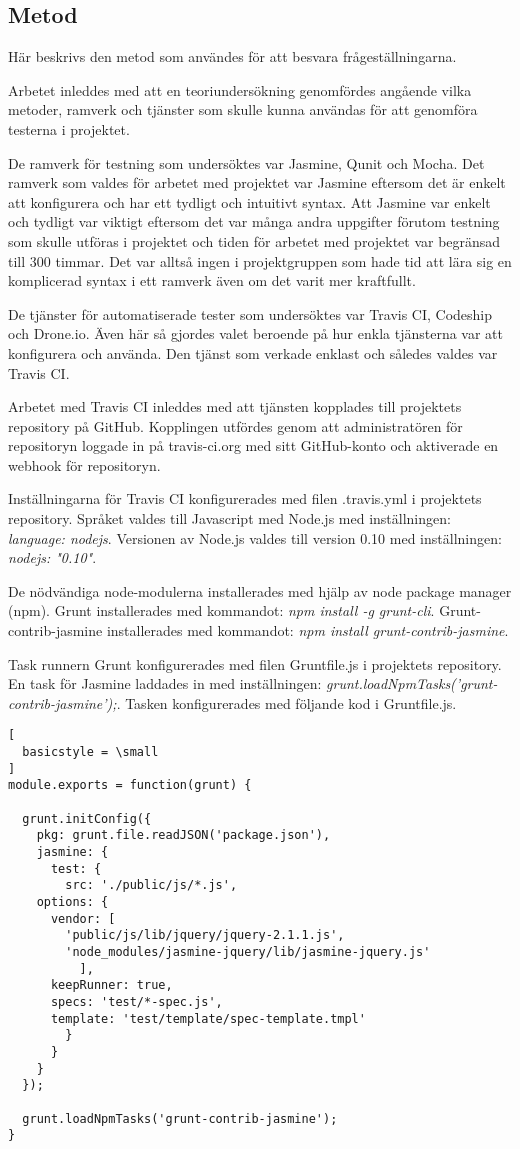 \subsection{Metod}
Här beskrivs den metod som användes för att 
besvara frågeställningarna.

Arbetet inleddes med att en teoriundersökning genomfördes
angående vilka metoder, ramverk och tjänster som skulle kunna
användas för att genomföra testerna i projektet.

De ramverk för
testning som undersöktes var Jasmine, Qunit och Mocha. Det
ramverk som valdes för arbetet med projektet var Jasmine
eftersom det är enkelt att konfigurera och har ett 
tydligt och intuitivt syntax. Att Jasmine var enkelt och tydligt
var viktigt eftersom det var många andra uppgifter förutom
testning som skulle utföras i projektet och tiden för
arbetet med projektet var begränsad till 300 timmar. Det var
alltså ingen i projektgruppen som hade tid att lära sig 
en komplicerad syntax i ett ramverk även om det varit
mer kraftfullt.

De tjänster för automatiserade tester som undersöktes var
Travis CI, Codeship och Drone.io. Även här 
så gjordes valet beroende på hur enkla tjänsterna var att
konfigurera och använda. Den tjänst som verkade enklast
och således valdes var Travis CI.

Arbetet med Travis CI inleddes med att tjänsten kopplades till 
projektets repository på GitHub. Kopplingen utfördes
genom att administratören för repositoryn loggade in på travis-ci.org med 
sitt GitHub-konto och aktiverade
en webhook för repositoryn.

Inställningarna för Travis CI konfigurerades med filen .travis.yml i projektets
repository. Språket valdes till
Javascript med Node.js med inställningen: \emph{language: node\textunderscore js}.
Versionen av Node.js valdes till version 0.10
med inställningen: \emph{node\textunderscore js: "0.10"}.

De nödvändiga node-modulerna installerades med hjälp av node package manager (npm).
Grunt installerades
med kommandot: \emph{npm install -g grunt-cli}. Grunt-contrib-jasmine installerades med kommandot: 
\emph{npm install grunt-contrib-jasmine}.

Task runnern Grunt konfigurerades med filen Gruntfile.js i projektets repository.
En task för Jasmine laddades in med
inställningen: \emph{grunt.loadNpmTasks('grunt-contrib-jasmine');}.
Tasken konfigurerades med följande kod i Gruntfile.js.

\begin{lstlisting}[
  basicstyle = \small
]
module.exports = function(grunt) {

  grunt.initConfig({
    pkg: grunt.file.readJSON('package.json'),
    jasmine: {
      test: {
        src: './public/js/*.js',
	options: {
	  vendor: [
	    'public/js/lib/jquery/jquery-2.1.1.js',
	    'node_modules/jasmine-jquery/lib/jasmine-jquery.js'
          ],
	  keepRunner: true,
	  specs: 'test/*-spec.js',
	  template: 'test/template/spec-template.tmpl'
        }
      }
    }
  });

  grunt.loadNpmTasks('grunt-contrib-jasmine');
}
\end{lstlisting}

